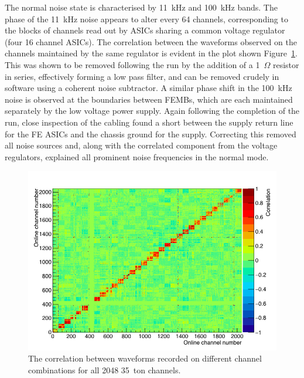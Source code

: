 The normal noise state is characterised by 11~kHz and 100~kHz bands.  The phase of the 11~kHz noise appears to alter every 64 channels, corresponding to the blocks of channels read out by ASICs sharing a common voltage regulator (four 16 channel ASICs).  The correlation between the waveforms observed on the channels maintained by the same regulator is evident in the plot shown Figure~\ref{fig:NoiseCorrelation}.  This was shown to be removed following the run by the addition of a 1~$\Omega$ resistor in series, effectively forming a low pass filter, and can be removed crudely in software using a coherent noise subtractor.  A similar phase shift in the 100~kHz noise is observed at the boundaries between FEMBs, which are each maintained separately by the low voltage power supply.  Again following the completion of the run, close inspection of the cabling found a short between the supply return line for the FE ASICs and the chassis ground for the supply.  Correcting this removed all noise sources and, along with the correlated component from the voltage regulators, explained all prominent noise frequencies in the normal mode.

\begin{figure}
  \centering
  \includegraphics[width=12cm]{NoiseCorrelation.png}
  \caption[The correlation between waveforms recorded on different channel combinations for all 2048 35~ton channels.]{The correlation between waveforms recorded on different channel combinations for all 2048 35~ton channels.}
  \label{fig:NoiseCorrelation}
\end{figure}

